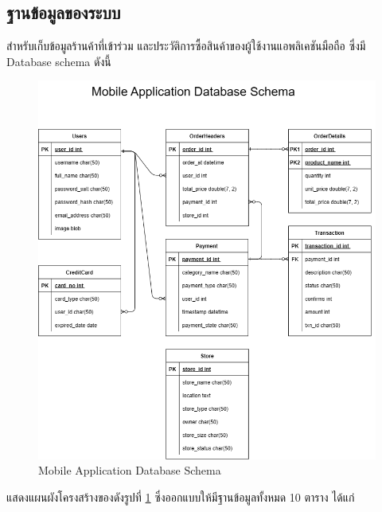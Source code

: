\subsection{ฐานข้อมูลของระบบ}
สำหรับเก็บข้อมูลร้านค้าที่เข้าร่วม และประวัติการซื้อสินค้าของผู้ใช้งานแอพลิเคชันมือถือ ซึ่งมี Database schema ดังนี้
\begin{figure}[h]
  \begin{center}

    \includegraphics[scale=0.3]{pic/datamobile.png}
  \end{center}

  \caption[Mobile Application Database Schema]{Mobile Application Database Schema}
  \label{fig:Mobile Application Database Schema}
\end{figure}
แสดงแผนผังโครงสร้างของดังรูปที่ \ref{fig:Mobile Application Database Schema} ซึ่งออกแบบให้มีฐานข้อมูลทั้งหมด 10 ตาราง ได้แก่ 

